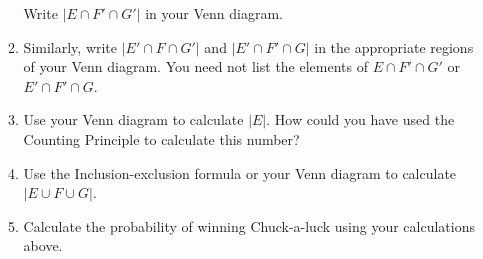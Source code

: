 \documentclass[12pt]{article}
\begin{document}
\begin{enumerate}
\begin{enumerate}
Write $\left|E\cap F'\cap G'\right|$ in your Venn diagram.
\vspace{1in}
\item Similarly, write
$\left|E'\cap F\cap G'\right|$
and $\left|E'\cap F'\cap G\right|$ in 
the appropriate regions of your Venn diagram.
You need not list the elements of
$E\cap F'\cap G'$ or $E'\cap F'\cap G$.
\item Use your Venn diagram to calculate
$\left|E\right|$. How could you have used
the Counting Principle to calculate this number?
\vspace{.5in}
\item Use the Inclusion-exclusion formula
or your Venn diagram to calculate
$\left|E\cup F\cup G\right|$.
\vspace{.5in}
\item Calculate the probability of winning
Chuck-a-luck using your calculations above.
\end{enumerate}
\end{enumerate}
\end{document}
